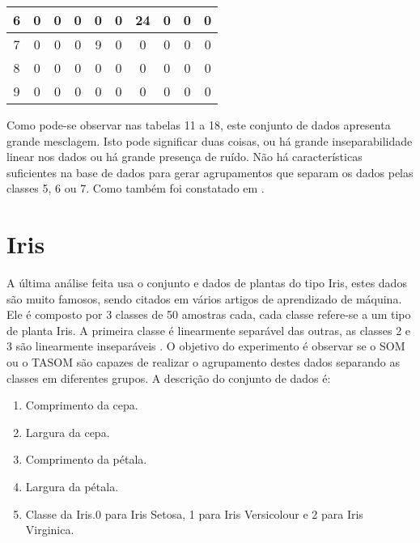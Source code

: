 \begin{table}[]
\begin{tabular}{|c|c|c|c|c|c|c|c|c|c|}
\rowcolor[HTML]{FFFFFF} 
6                         & 0                          & 0                          & 0                          & 0  & 0  & \cellcolor[HTML]{34CDF9}24 & 0  & 0                         & 0 \\ \hline
\rowcolor[HTML]{FFFFFF} 
7                         & 0                          & 0                          & 0                          & 9  & 0  & 0                          & 0  & 0                         & 0 \\ \hline
\rowcolor[HTML]{FFFFFF} 
8                         & 0                          & 0                          & 0                          & 0  & 0  & 0                          & 0  & 0                         & 0 \\ \hline
\rowcolor[HTML]{FFFFFF} 
9                         & 0                          & 0                          & 0                          & 0  & 0  & 0                          & 0  & 0                         & 0 \\ \hline
\end{tabular}
\end{table}


Como pode-se observar nas tabelas 11 a 18, este conjunto de dados apresenta grande mesclagem. Isto pode significar duas coisas, ou há grande inseparabilidade linear nos dados ou há grande presença de ruído. Não há características suficientes na base de dados para gerar agrupamentos que separam os dados pelas classes 5, 6 ou 7. Como também foi constatado em \cite{hialo2014}.

\section{Iris} 
A última análise feita usa o conjunto e dados de plantas do tipo Iris, estes dados são muito famosos, sendo citados em vários artigos de aprendizado de máquina. Ele é composto por 3 classes de 50 amostras cada, cada classe refere-se a um tipo de planta Iris. A primeira classe é linearmente separável das outras, as classes 2 e 3 são linearmente inseparáveis \cite{iris}. O objetivo do experimento é observar se o SOM ou o TASOM são capazes de realizar o agrupamento destes dados separando as classes em diferentes grupos. A descrição do conjunto de dados é:

\begin{enumerate}
\item Comprimento da cepa.
\item Largura da cepa.
\item Comprimento da pétala.
\item Largura da pétala.
\item Classe da Iris.0 para Iris Setosa, 1 para  Iris Versicolour e 2 para Iris Virginica.
\end{enumerate}

